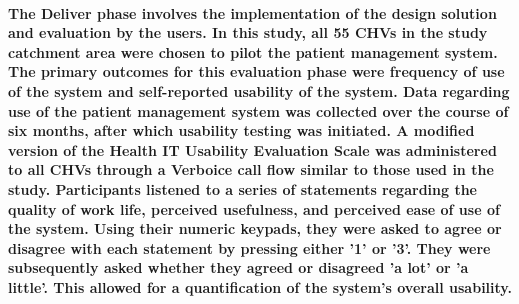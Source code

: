 \paragraph{The Deliver phase involves the implementation of the design solution and evaluation by the users. In this study, all 55 CHVs in the study catchment area were chosen to pilot the patient management system. The primary outcomes for this evaluation phase were frequency of use of the system and self-reported usability of the system. Data regarding use of the patient management system was collected over the course of six months, after which usability testing was initiated. A modified version of the Health IT Usability Evaluation Scale \citep{Yen2010} was administered to all CHVs through a Verboice call flow similar to those used in the study. Participants listened to a series of statements regarding the quality of work life, perceived usefulness, and perceived ease of use of the system. Using their numeric keypads, they were asked to agree or disagree with each statement by pressing either '1' or '3'. They were subsequently asked whether they agreed or disagreed 'a lot' or 'a little'. This allowed for a quantification of the system's overall usability.}